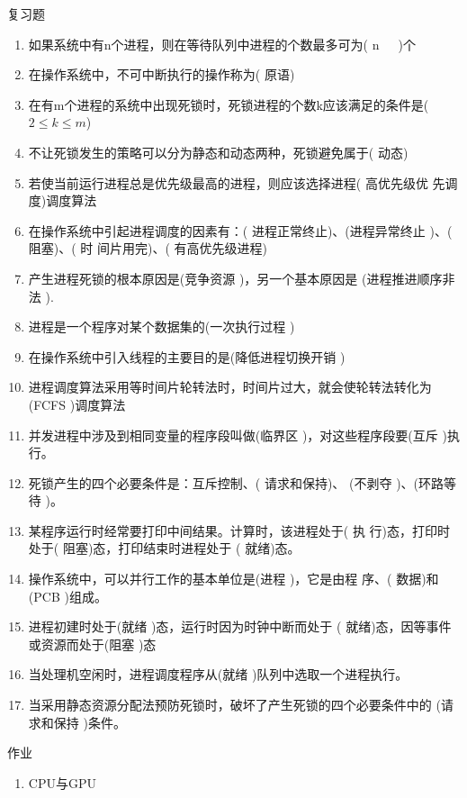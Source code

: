 \begin{frame}{复习题}
  \begin{enumerate}
  \item 如果系统中有n个进程，则在等待队列中进程的个数最多可为( {\color{white}n~~~})个
  \item 在操作系统中，不可中断执行的操作称为( {\color{white}原语})
  \item 在有m个进程的系统中出现死锁时，死锁进程的个数k应该满足的条件是(
    {\color{white}$2 \leq k \leq m$})
  \item 不让死锁发生的策略可以分为静态和动态两种，死锁避免属于( {\color{white}
      动态})
  \item 若使当前运行进程总是优先级最高的进程，则应该选择进程( {\color{white}高优先级优
      先调度})调度算法
  \item 在操作系统中引起进程调度的因素有：( {\color{white}进程正常终止})、({\color{white}进程异常终止 })、({\color{white} 阻塞})、({\color{white} 时
      间片用完})、({\color{white} 有高优先级进程})
  \item 产生进程死锁的根本原因是({\color{white}竞争资源 })，另一个基本原因是
    ({\color{white}进程推进顺序非法 }).
  \item 进程是一个程序对某个数据集的({\color{white}一次执行过程 })
  \item 在操作系统中引入线程的主要目的是({\color{white}降低进程切换开销 })
  \item 进程调度算法采用等时间片轮转法时，时间片过大，就会使轮转法转化为({\color{white}FCFS })调度算法
  \item 并发进程中涉及到相同变量的程序段叫做({\color{white}临界区 })，对这些程序段要({\color{white}互斥 })执行。
  \item 死锁产生的四个必要条件是：互斥控制、({\color{white} }请求和保持)、
    ({\color{white}不剥夺 })、({\color{white}环路等待 })。
  \item 某程序运行时经常要打印中间结果。计算时，该进程处于({\color{white} 执
      行})态，打印时处于({\color{white} 阻塞})态，打印结束时进程处于
    ({\color{white} 就绪})态。
  \item 操作系统中，可以并行工作的基本单位是({\color{white}进程 })，它是由程
    序、({\color{white} 数据})和({\color{white}PCB })组成。
  \item 进程初建时处于({\color{white}就绪 })态，运行时因为时钟中断而处于
    ({\color{white} 就绪})态，因等事件或资源而处于({\color{white}阻塞 })态
  \item 当处理机空闲时，进程调度程序从({\color{white}就绪 })队列中选取一个进程执行。
  \item 当采用静态资源分配法预防死锁时，破坏了产生死锁的四个必要条件中的
    ({\color{white}请求和保持 })条件。
  \end{enumerate}
\end{frame}

\begin{frame}[fragile]{作业}
  \begin{enumerate}
  \item CPU与GPU
  \end{enumerate}
\end{frame}

